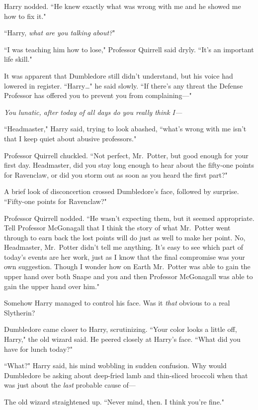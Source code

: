 Harry nodded. ``He knew exactly what was wrong with me and he showed me how to fix it."

``Harry, \emph{what are you talking about?}"

``I was teaching him how to lose," Professor Quirrell said dryly. ``It's an important life skill."

It was apparent that Dumbledore still didn't understand, but his voice had lowered in register. ``Harry{\ldots}" he said slowly. ``If there's any threat the Defense Professor has offered you to prevent you from complaining—"

\emph{You lunatic, after today of all days do you really think I—}

``Headmaster," Harry said, trying to look abashed, ``what's wrong with me isn't that I keep quiet about abusive professors."

Professor Quirrell chuckled. ``Not perfect, Mr.~Potter, but good enough for your first day. Headmaster, did you stay long enough to hear about the fifty-one points for Ravenclaw, or did you storm out as soon as you heard the first part?"

A brief look of disconcertion crossed Dumbledore's face, followed by surprise. ``Fifty-one points for Ravenclaw?"

Professor Quirrell nodded. ``He wasn't expecting them, but it seemed appropriate. Tell Professor McGonagall that I think the story of what Mr.~Potter went through to earn back the lost points will do just as well to make her point. No, Headmaster, Mr.~Potter didn't tell me anything. It's easy to see which part of today's events are her work, just as I know that the final compromise was your own suggestion. Though I wonder how on Earth Mr.~Potter was able to gain the upper hand over both Snape and you and then Professor McGonagall was able to gain the upper hand over him."

Somehow Harry managed to control his face. Was it \emph{that} obvious to a real Slytherin?

Dumbledore came closer to Harry, scrutinizing. ``Your color looks a little off, Harry," the old wizard said. He peered closely at Harry's face. ``What did you have for lunch today?"

``What?" Harry said, his mind wobbling in sudden confusion. Why would Dumbledore be asking about deep-fried lamb and thin-sliced broccoli when that was just about the \emph{last} probable cause of—

The old wizard straightened up. ``Never mind, then. I think you're fine."

